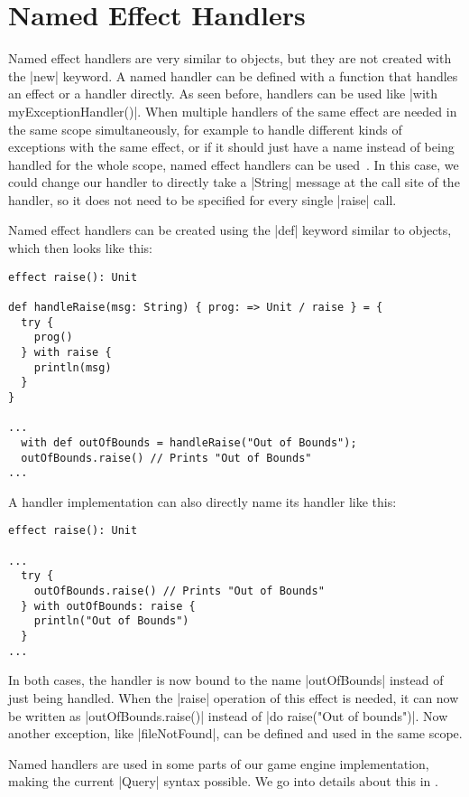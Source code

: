 \section{Named Effect Handlers}

Named effect handlers are very similar to objects, but they are not created with the |new| keyword. A named handler can be defined with a function that handles an effect or a handler directly. As seen before, handlers can be used like |with myExceptionHandler()|. When multiple handlers of the same effect are needed in the same scope simultaneously, for example to handle different kinds of exceptions with the same effect, or if it should just have a name instead of being handled for the whole scope, named effect handlers can be used~\cite{xie2022named}. In this case, we could change our handler to directly take a |String| message at the call site of the handler, so it does not need to be specified for every single |raise| call.

Named effect handlers can be created using the |def| keyword similar to objects, which then looks like this:

\begin{lstlisting}
effect raise(): Unit

def handleRaise(msg: String) { prog: => Unit / raise } = {
  try {
    prog()
  } with raise {
    println(msg)
  }
}

...
  with def outOfBounds = handleRaise("Out of Bounds");
  outOfBounds.raise() // Prints "Out of Bounds"
...
\end{lstlisting}

A handler implementation can also directly name its handler like this:

\begin{lstlisting}
effect raise(): Unit

...
  try {
    outOfBounds.raise() // Prints "Out of Bounds"
  } with outOfBounds: raise {
    println("Out of Bounds")
  }
...
\end{lstlisting}

In both cases, the handler is now bound to the name |outOfBounds| instead of just being handled. When the |raise| operation of this effect is needed, it can now be written as |outOfBounds.raise()| instead of |do raise("Out of bounds")|. Now another exception, like |fileNotFound|, can be defined and used in the same scope.

Named handlers are used in some parts of our game engine implementation, making the current |Query| syntax possible. We go into details about this in .

